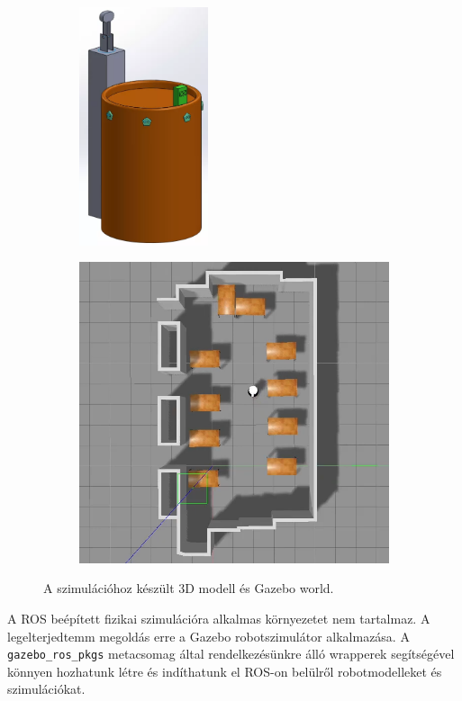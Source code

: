 \begin{figure}
    \centering
    \begin{subfigure}[b]{0.45\linewidth}
        \includegraphics[height=7cm]{figures/biscee_model.png}
    \end{subfigure}
    \begin{subfigure}[b]{0.45\linewidth}
        \includegraphics[width=\linewidth]{figures/simulation_from_above.png}
    \end{subfigure}
    \caption{A szimulációhoz készült 3D modell és Gazebo world.}
    \label{fig:3d_model_and_gazebo_world}
\end{figure}

A ROS beépített fizikai szimulációra alkalmas környezetet nem tartalmaz. A legelterjedtemm megoldás erre a Gazebo robotszimulátor alkalmazása. A \lstinline{gazebo_ros_pkgs} metacsomag által rendelkezésünkre álló wrapperek segítségével könnyen hozhatunk létre és indíthatunk el ROS-on belülről robotmodelleket és szimulációkat.

